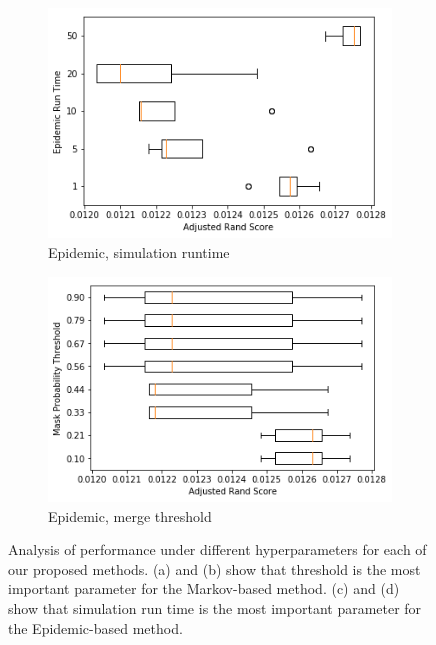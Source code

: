 \documentclass[twocolumn]{article}
\newcommand{\figlab}[1]{\label{fig:#1}}
\begin{document}
\begin{figure}[t!]
  \begin{subfigure}{0.49\linewidth}
    \includegraphics[width=\linewidth]{figs/epidemic_run.png}
    \caption{Epidemic, simulation runtime}
  \end{subfigure}
  \begin{subfigure}{0.49\linewidth}
    \includegraphics[width=\linewidth]{figs/epidemic_thresh.png}
    \caption{Epidemic, merge threshold}
  \end{subfigure}

  \caption{
    Analysis of performance under different hyperparameters for each of our
    proposed methods. (a) and (b) show that threshold is the most important
    parameter for the Markov-based method. (c) and (d) show that simulation run
    time is the most important parameter for the Epidemic-based method.
  }
  \figlab{param_sweep}

\end{figure}
\end{document}
